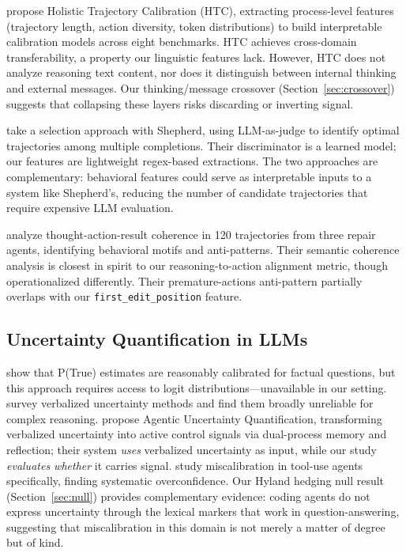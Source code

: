 \documentclass[11pt]{article}
\newcommand{\feat}[1]{\texttt{#1}}
\begin{document}
\citet{zhang2026htc} propose Holistic Trajectory Calibration (HTC), extracting process-level features (trajectory length, action diversity, token distributions) to build interpretable calibration models across eight benchmarks.
HTC achieves cross-domain transferability, a property our linguistic features lack.
However, HTC does not analyze reasoning text content, nor does it distinguish between internal thinking and external messages.
Our thinking/message crossover (Section~\ref{sec:crossover}) suggests that collapsing these layers risks discarding or inverting signal.

\citet{cuadron2025shepherd} take a selection approach with Shepherd, using LLM-as-judge to identify optimal trajectories among multiple completions.
Their discriminator is a learned model; our features are lightweight regex-based extractions.
The two approaches are complementary: behavioral features could serve as interpretable inputs to a system like Shepherd's, reducing the number of candidate trajectories that require expensive LLM evaluation.

\citet{bouzenia2025understanding} analyze thought-action-result coherence in 120 trajectories from three repair agents, identifying behavioral motifs and anti-patterns.
Their semantic coherence analysis is closest in spirit to our reasoning-to-action alignment metric, though operationalized differently.
Their premature-actions anti-pattern partially overlaps with our \feat{first\_edit\_position} feature.

\subsection{Uncertainty Quantification in LLMs}

\citet{kadavath2022language} show that P(True) estimates are reasonably calibrated for factual questions, but this approach requires access to logit distributions---unavailable in our setting.
\citet{xiong2024can} survey verbalized uncertainty methods and find them broadly unreliable for complex reasoning.
\citet{zhang2026auq} propose Agentic Uncertainty Quantification, transforming verbalized uncertainty into active control signals via dual-process memory and reflection; their system \emph{uses} verbalized uncertainty as input, while our study \emph{evaluates whether} it carries signal.
\citet{xuan2026confidence} study miscalibration in tool-use agents specifically, finding systematic overconfidence.
Our Hyland hedging null result (Section~\ref{sec:null}) provides complementary evidence: coding agents do not express uncertainty through the lexical markers that work in question-answering, suggesting that miscalibration in this domain is not merely a matter of degree but of kind.
\end{document}
